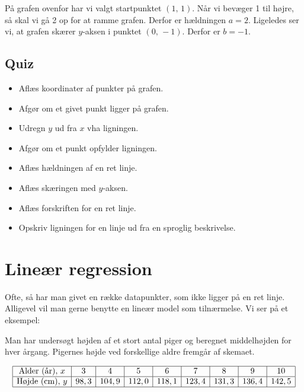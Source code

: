 \documentclass[12pt,oneside,a4paper]{article}
\begin{document}
På grafen ovenfor har vi valgt startpunktet $(1,\,1)$. Når vi bevæger
1 til højre, så skal vi gå 2 op for at ramme grafen. Derfor er hældningen $a=2$.
Ligeledes ser vi, at grafen skærer $y$-aksen i punktet $(0,\,-1)$. Derfor er
$b=-1$.


%


\subsection{Quiz}
\begin{itemize}
    \item Aflæs koordinater af punkter på grafen.
    \item Afgør om et givet punkt ligger på grafen.
    \item Udregn $y$ ud fra $x$ vha ligningen.
    \item Afgør om et punkt opfylder ligningen.
    \item Aflæs hældningen af en ret linje.
    \item Aflæs skæringen med $y$-aksen.
    \item Aflæs forskriften for en ret linje.
    \item Opskriv ligningen for en linje ud fra en sproglig beskrivelse.
\end{itemize}



\section{Lineær regression}
Ofte, så har man givet en række datapunkter, som ikke ligger på en ret linje. Alligevel
vil man gerne benytte en lineær model som tilnærmelse. Vi ser på et eksempel:

Man har undersøgt højden af et stort antal piger og beregnet middel\-høj\-den for
hver årgang. Pigernes højde ved forskellige aldre fremgår af skemaet.

\[
\begin{array}{|c|c|c|c|c|c|c|c|c|}
    \hline
    \mbox{Alder (år)},\, x &  3 &  4 &  5 &  6 &  7 &  8 & 9 & 10 \\
    \hline
    \mbox{Højde (cm)},\, y &  98,3 &   104,9 &  112,0 &  118,1 &  123,4 &  131,3 & 136,4 & 142,5\\
    \hline
\end{array}
\]
\end{document}
